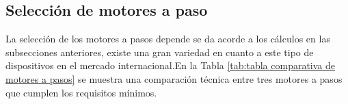 
\subsection{Selección de motores a paso}
	
La selección de los motores a pasos depende se da acorde a los cálculos en las subsecciones anteriores, existe una gran variedad en cuanto a este tipo de dispositivos en el mercado internacional.En la Tabla \ref{tab:tabla comparativa de motores a pasos} se muestra una comparación técnica entre tres motores a pasos que cumplen los requisitos mínimos.	 

